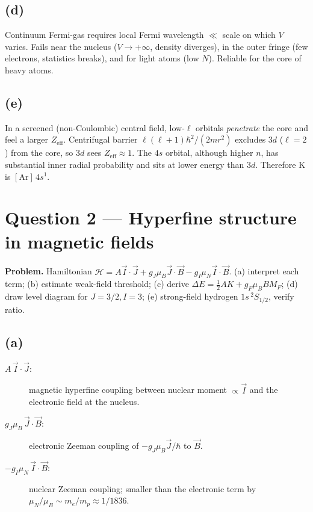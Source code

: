 \documentclass[11pt]{article}
\begin{document}
\subsection*{(d)}

Continuum Fermi-gas requires local Fermi wavelength $\ll$ scale on which $V$ varies. Fails near the nucleus ($V\to+\infty$, density diverges), in the outer fringe (few electrons, statistics breaks), and for light atoms (low $N$). Reliable for the core of heavy atoms.

\subsection*{(e)}

In a screened (non-Coulombic) central field, low-$\ell$ orbitals \emph{penetrate} the core and feel a larger $Z_\text{eff}$. Centrifugal barrier $\ell(\ell+1)\hbar^2/(2mr^2)$ excludes $3d$ ($\ell=2$) from the core, so $3d$ sees $Z_\text{eff}\approx 1$. The $4s$ orbital, although higher $n$, has substantial inner radial probability and sits at lower energy than $3d$. Therefore K is $[\text{Ar}]\,4s^1$.

\section*{Question 2 --- Hyperfine structure in magnetic fields}

\textbf{Problem.} Hamiltonian $\mathcal H=A\vec I\!\cdot\!\vec J+g_J\mu_B\vec J\!\cdot\!\vec B-g_I\mu_N\vec I\!\cdot\!\vec B$. (a) interpret each term; (b) estimate weak-field threshold; (c) derive $\Delta E=\tfrac12 AK+g_F\mu_B B M_F$; (d) draw level diagram for $J=3/2,I=3$; (e) strong-field hydrogen $1s\,{}^2S_{1/2}$, verify ratio.

\subsection*{(a)}

\begin{description}
\item[$A\,\vec I\cdot\vec J$:] magnetic hyperfine coupling between nuclear moment $\propto\vec I$ and the electronic field at the nucleus.
\item[$g_J\mu_B\,\vec J\cdot\vec B$:] electronic Zeeman coupling of $-g_J\mu_B\vec J/\hbar$ to $\vec B$.
\item[$-g_I\mu_N\,\vec I\cdot\vec B$:] nuclear Zeeman coupling; smaller than the electronic term by $\mu_N/\mu_B\sim m_e/m_p\approx 1/1836$.
\end{description}
\end{document}
